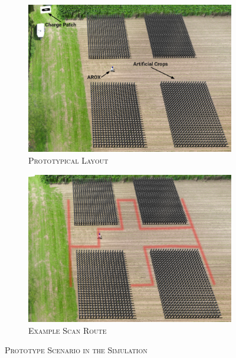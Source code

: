 \documentclass[english, master, utf8]{base/thesis_KBS}
\begin{document}
\begin{figure}[H]
    \centering
    \begin{subfigure}[b]{0.49\textwidth}
        \centering
        \includegraphics[width=\textwidth]{pics/prototype_scenario.jpg}
        \caption{\textsc{Prototypical Layout}}
        \label{fig:prototypical_layout}
    \end{subfigure}
    \hfill
    \begin{subfigure}[b]{0.49\textwidth}
        \centering
        \includegraphics[width=\textwidth]{pics/example_path.png}
        \caption{\textsc{Example Scan Route}}
        \label{fig:example_scan_route}
    \end{subfigure}
\caption{\textsc{Prototype Scenario in the Simulation}}
\label{fig:prototype_sim}
\end{figure}
\end{document}
